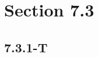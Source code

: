 \documentclass{article}
\begin{document}
\newcommand{\hr}{\par\noindent\rule{\textwidth}{0.4pt}}

\newcommand{\bc}[1]{
	\begin{equation*}
		\begin{boxed}
			{#1}
		\end{boxed}
	\end{equation*}
}

\newcommand{\cond}[2]{
	\ifmmode
		{#1} \quad {#2}
	\else
		$$ {#1} \quad {#2} $$
	\fi
}

\newcommand{\matr}[1]{
	\ifmmode \bm{#1}
	\else \textit{\textbf{#1}}
	\fi
}
\newcommand{\vect}[1]{
	\ifmmode \mathbf{#1}
	\else \textbf{#1}
	\fi
}

\tableofcontents

\section{Section 7.3}

\subsection{7.3.1-T}
\end{document}
